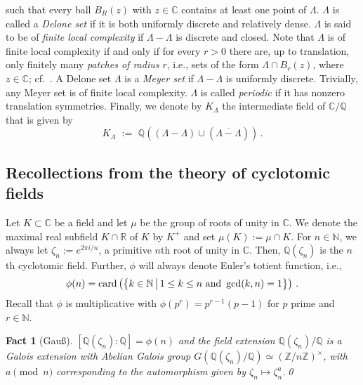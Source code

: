 \documentclass[a4paper]{amsart}
\newtheorem{fact}[theorem]{Fact}
\theoremstyle{definition}
\numberwithin{equation}{section}
\numberwithin{theorem}{section}
\begin{document}
  such that every ball $B_{R}(z)$ with $z\in{\mathbb{C}}$ contains at least one point of
  $\varLambda$. $\varLambda$ is called a {\em Delone set} if it is both uniformly
  discrete and relatively dense. $\varLambda$ is said to be of
  \emph{finite local complexity} if $\varLambda-\varLambda$ is
  discrete and closed. Note that $\varLambda$ is of finite local complexity if and
  only if for every $r>0$ there
  are, up to translation, only finitely many \emph{patches of radius
    $r$}, i.e., sets of the form $\varLambda\cap
  B_{r}(z)$, where $z\in{\mathbb{C}}$; cf.~\cite{Moody}.  A Delone set $\varLambda$ is a \emph{Meyer set} if $\varLambda-\varLambda$ is
  uniformly discrete. Trivially, any Meyer set
  is of finite local complexity. $\varLambda$ is called {\em periodic} if it has
nonzero translation symmetries. Finally, we denote by $K_{\varLambda}$
the intermediate field of ${\mathbb{C}}/{\mathbb{Q}}$ that is given by 
$$
K_{\varLambda}\,\,:=\,\,{\mathbb{Q}}\left(\left(\varLambda-\varLambda\right)\cup\left(\overline{\varLambda-\varLambda}\right)\right)\,.
$$

\subsection{Recollections from the theory of cyclotomic fields}

Let $K\subset{\mathbb{C}}$ be a field and let $\mu$ be the group of roots of unity in
${\mathbb{C}}$. We denote the maximal real subfield $K\cap{\mathbb{R}}$ of $K$ by $K^+$ and set $\mu(K):=\mu\cap K$. For $n\in \mathbb{N}$, we always let $\zeta_n := e^{2\pi
    i/n}$, a primitive $n$th root of unity in ${\mathbb{C}}$. Then, ${\mathbb{Q}}(\zeta_n)$ is the
  $n$th cyclotomic field.  Further, $\phi$ will always denote Euler's totient function, i.e., $$\phi(n) =
\operatorname{card}\left(\big\{k \in \mathbb{N}\,\big |\,1 \leq k \leq n
  \textnormal{ and } \operatorname{gcd}(k,n)=1\big\}\right)\,.$$
Recall that $\phi$ is multiplicative with $\phi(p^r)=p^{r-1}(p-1)$ for
$p$ prime and $r\in{\mathbb{N}}$. 

\begin{fact}[Gau\ss]\cite[Thm.~ 2.5]{Wa}\label{gau}
 $[{\mathbb{Q}}(\zeta_n) :
  {\mathbb{Q}}] = \phi(n)$ and the field extension ${\mathbb{Q}}(\zeta_n)/ {\mathbb{Q}}$
is a Galois extension with Abelian Galois group $G({\mathbb{Q}}(\zeta_n)/
{\mathbb{Q}}) \simeq ({\mathbb{Z}} / n{\mathbb{Z}})^{\times}$,
with $a \pmod n$ corresponding to the automorphism given by $\zeta_n \mapsto \zeta_n^{a}$.\qed
\end{fact}
\end{document}
